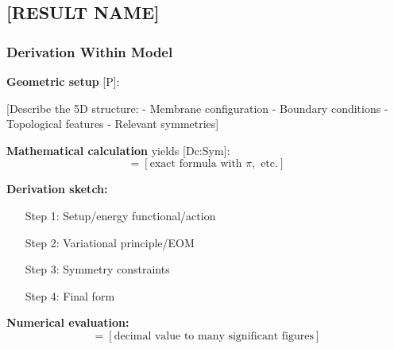 


\subsection{[RESULT NAME]}
\label{sec:[result_label]}


\subsubsection{Derivation Within Model}

\textbf{Geometric setup} [P]:

[Describe the 5D structure:
- Membrane configuration
- Boundary conditions
- Topological features
- Relevant symmetries]

\textbf{Mathematical calculation} yields [Dc:Sym]:
\begin{equation}
  [\text{quantity}] = [\text{exact formula with } \pi, \text{ etc.}]
  \label{eq:[result_formula]}
\end{equation}

\textbf{Derivation sketch:}
\begin{enumerate}
\item [Step 1: Setup/energy functional/action]
\item [Step 2: Variational principle/EOM]
\item [Step 3: Symmetry constraints]
\item [Step 4: Final form]
\end{enumerate}

\textbf{Numerical evaluation:}
\begin{equation}
  [\text{quantity}] = [\text{decimal value to many significant figures}]
\end{equation}

